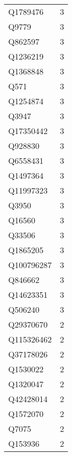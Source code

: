 \begin{tabular}{lr}
    Q1789476 &                             3 \\
       Q9779 &                             3 \\
     Q862597 &                             3 \\
    Q1236219 &                             3 \\
    Q1368848 &                             3 \\
        Q571 &                             3 \\
    Q1254874 &                             3 \\
       Q3947 &                             3 \\
   Q17350442 &                             3 \\
     Q928830 &                             3 \\
    Q6558431 &                             3 \\
    Q1497364 &                             3 \\
   Q11997323 &                             3 \\
       Q3950 &                             3 \\
      Q16560 &                             3 \\
      Q33506 &                             3 \\
    Q1865205 &                             3 \\
  Q100796287 &                             3 \\
     Q846662 &                             3 \\
   Q14623351 &                             3 \\
     Q506240 &                             3 \\
   Q29370670 &                             2 \\
  Q115326462 &                             2 \\
   Q37178026 &                             2 \\
    Q1530022 &                             2 \\
    Q1320047 &                             2 \\
   Q42428014 &                             2 \\
    Q1572070 &                             2 \\
       Q7075 &                             2 \\
     Q153936 &                             2 \\

\end{tabular}
